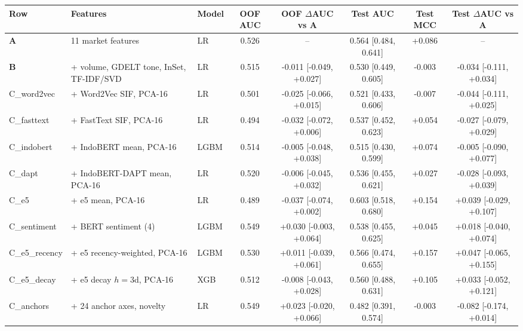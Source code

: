 \begin{tabular}{@{}l l l c c c c c@{}}
\toprule
\textbf{Row} & \textbf{Features} & \textbf{Model} & \textbf{OOF AUC} & \textbf{OOF $\Delta$AUC vs A} & \textbf{Test AUC} & \textbf{Test MCC} & \textbf{Test $\Delta$AUC vs A} \\
\midrule
\textbf{A} & 11 market features & LR & 0.526 & -- & 0.564 {\scriptsize[0.484, 0.641]} & +0.086 & -- \\
\textbf{B} & + volume, GDELT tone, InSet, TF-IDF/SVD & LR & 0.515 & -0.011 {\scriptsize[-0.049, +0.027]} & 0.530 {\scriptsize[0.449, 0.605]} & -0.003 & -0.034 {\scriptsize[-0.111, +0.034]} \\
\midrule
C\_word2vec & + Word2Vec SIF, PCA-16 & LR & 0.501 & -0.025 {\scriptsize[-0.066, +0.015]} & 0.521 {\scriptsize[0.433, 0.606]} & -0.007 & -0.044 {\scriptsize[-0.111, +0.025]} \\
C\_fasttext & + FastText SIF, PCA-16 & LR & 0.494 & -0.032 {\scriptsize[-0.072, +0.006]} & 0.537 {\scriptsize[0.452, 0.623]} & +0.054 & -0.027 {\scriptsize[-0.079, +0.029]} \\
C\_indobert & + IndoBERT mean, PCA-16 & LGBM & 0.514 & -0.005 {\scriptsize[-0.048, +0.038]} & 0.515 {\scriptsize[0.430, 0.599]} & +0.074 & -0.005 {\scriptsize[-0.090, +0.077]} \\
C\_dapt & + IndoBERT-DAPT mean, PCA-16 & LR & 0.520 & -0.006 {\scriptsize[-0.045, +0.032]} & 0.536 {\scriptsize[0.455, 0.621]} & +0.027 & -0.028 {\scriptsize[-0.093, +0.039]} \\
C\_e5 & + e5 mean, PCA-16 & LR & 0.489 & -0.037 {\scriptsize[-0.074, +0.002]} & 0.603 {\scriptsize[0.518, 0.680]} & +0.154 & +0.039 {\scriptsize[-0.029, +0.107]} \\
C\_sentiment & + BERT sentiment (4) & LGBM & 0.549 & +0.030 {\scriptsize[-0.003, +0.064]} & 0.538 {\scriptsize[0.455, 0.625]} & +0.045 & +0.018 {\scriptsize[-0.040, +0.074]} \\
\midrule
C\_e5\_recency & + e5 recency-weighted, PCA-16 & LGBM & 0.530 & +0.011 {\scriptsize[-0.039, +0.061]} & 0.566 {\scriptsize[0.474, 0.655]} & +0.157 & +0.047 {\scriptsize[-0.065, +0.155]} \\
C\_e5\_decay & + e5 decay $h{=}3$d, PCA-16 & XGB & 0.512 & -0.008 {\scriptsize[-0.043, +0.028]} & 0.560 {\scriptsize[0.488, 0.631]} & +0.105 & +0.033 {\scriptsize[-0.052, +0.121]} \\
\midrule
C\_anchors & + 24 anchor axes, novelty & LR & 0.549 & +0.023 {\scriptsize[-0.020, +0.066]} & 0.482 {\scriptsize[0.391, 0.574]} & -0.003 & -0.082 {\scriptsize[-0.174, +0.014]} \\

\end{tabular}
